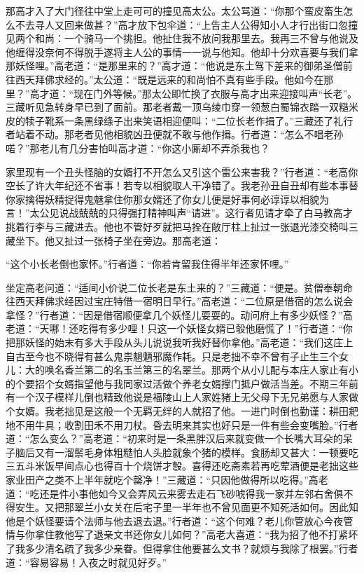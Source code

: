 \documentclass[12pt,UTF8]{ctexbook}
\begin{document}
{那高才入了大门径往中堂上走可可的撞见高太公。太公骂道：“你那个蛮皮畜生怎么不去寻人又回来做甚？”高才放下包伞道：“上告主人公得知小人才行出街口忽撞见两个和尚：一个骑马一个挑担。他扯住我不放问我那里去。我再三不曾与他说及他缠得没奈何不得脱手遂将主人公的事情一一说与他知。他却十分欢喜要与我们拿那妖怪哩。”高老道：“是那里来的？”高才道：“他说是东土驾下差来的御弟圣僧前往西天拜佛求经的。”太公道：“既是远来的和尚怕不真有些手段。他如今在那里？”高才道：“现在门外等候。”那太公即忙换了衣服与高才出来迎接叫声“长老”。三藏听见急转身早已到了面前。那老者戴一顶乌绫巾穿一领葱白蜀锦衣踏一双糙米皮的犊子靴系一条黑绿绦子出来笑语相迎便叫：“二位长老作揖了。”三藏还了礼行者站着不动。那老者见他相貌凶丑便就不敢与他作揖。行者道：“怎么不唱老孙喏？”那老儿有几分害怕叫高才道：“你这小厮却不弄杀我也？

家里现有一个丑头怪脑的女婿打不开怎么又引这个雷公来害我？”行者道：“老高你空长了许大年纪还不省事！若专以相貌取人干净错了。我老孙丑自丑却有些本事替你家擒得妖精捉得鬼魅拿住你那女婿还了你女儿便是好事何必谆谆以相貌为言！”太公见说战兢兢的只得强打精神叫声“请进”。这行者见请才牵了白马教高才挑着行李与三藏进去。他也不管好歹就把马拴在敞厅柱上扯过一张退光漆交椅叫三藏坐下。他又扯过一张椅子坐在旁边。那高老道：

“这个小长老倒也家怀。”行者道：“你若肯留我住得半年还家怀哩。”

坐定高老问道：“适间小价说二位长老是东土来的？”三藏道：“便是。贫僧奉朝命往西天拜佛求经因过宝庄特借一宿明日早行。”高老道：“二位原是借宿的怎么说会拿怪？”行者道：“因是借宿顺便拿几个妖怪儿耍耍的。动问府上有多少妖怪？”高老道：“天哪！还吃得有多少哩！只这一个妖怪女婿已彀他磨慌了！”行者道：“你把那妖怪的始末有多大手段从头儿说说我听我好替你拿他。”高老道：“我们这庄上自古至今也不晓得有甚么鬼祟魍魉邪魔作耗。只是老拙不幸不曾有子止生三个女儿：大的唤名香兰第二的名玉兰第三的名翠兰。那两个从小儿配与本庄人家止有小的个要招个女婿指望他与我同家过活做个养老女婿撑门抵户做活当差。不期三年前有一个汉子模样儿倒也精致他说是福陵山上人家姓猪上无父母下无兄弟愿与人家做个女婿。我老拙见是这般一个无羁无绊的人就招了他。一进门时倒也勤谨：耕田耙地不用牛具；收割田禾不用刀杖。昏去明来其实也好只是一件有些会变嘴脸。”行者道：“怎么变么？”高老道：“初来时是一条黑胖汉后来就变做一个长嘴大耳朵的呆子脑后又有一溜鬃毛身体粗糙怕人头脸就象个猪的模样。食肠却又甚大：一顿要吃三五斗米饭早间点心也得百十个烧饼才彀。喜得还吃斋素若再吃荤酒便是老拙这些家业田产之类不上半年就吃个罄净！”三藏道：“只因他做得所以吃得。”高老道：“吃还是件小事他如今又会弄风云来雾去走石飞砂唬得我一家并左邻右舍俱不得安生。又把那翠兰小女关在后宅子里一半年也不曾见面更不知死活如何。因此知他是个妖怪要请个法师与他去退去退。”行者道：“这个何难？老儿你管放心今夜管情与你拿住教他写了退亲文书还你女儿如何？”高老大喜道：“我为招了他不打紧坏了我多少清名疏了我多少亲眷。但得拿住他要甚么文书？就烦与我除了根罢。”行者道：“容易容易！入夜之时就见好歹。”

}
\end{document}
